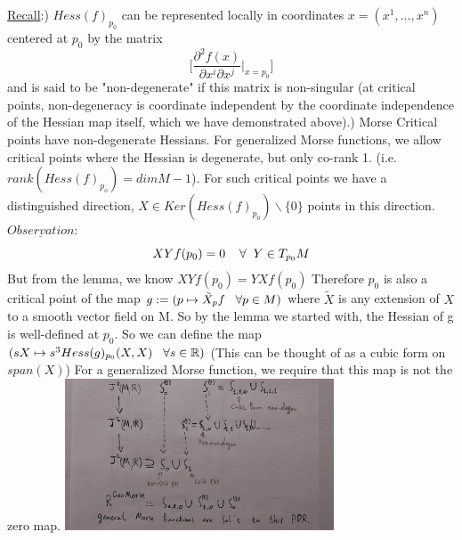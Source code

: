 \documentclass{article}
\newtheorem{proposed work}[theorem]{Proposed Work}
\begin{document}
\underline{Recall}:) $Hess(f)_{p_0}$ can be represented locally in coordinates $x=(x^1,...,x^n)$ centered at $p_0$ by the matrix $$\Big[\frac{\partial^2 f(x)}{\partial x^i \partial x^j}\Big|_{x=p_0}\Big]$$ and is said to be "non-degenerate" if this matrix is non-singular (at critical points, non-degeneracy is coordinate independent by the coordinate independence of the Hessian map itself, which we have demonstrated above).) Morse Critical points have non-degenerate Hessians.
\newline
\newline
For generalized Morse functions, we allow critical points where the Hessian is degenerate, but only co-rank 1. (i.e. $rank(Hess(f)_{p_o})=dimM-1$). For such critical points we have a distinguished direction, $X\in Ker(Hess(f)_{p_0})\backslash \{0\}$ points in this direction.
\newline
\newline
$\underline{Observation}:$ 
$$XYf(p_0)=0\hspace{4mm} \forall \hspace{2mm}Y\in T_{p_0}M$$
But from the lemma, we know $XYf(p_0)=YXf(p_0)$
Therefore $p_0$ is also a critical point of the map $g:=(p\mapsto \tilde{X}_pf \hspace{3mm}\forall p\in M)$ where $\tilde{X}$ is any extension of $X$ to a smooth vector field on M. So by the lemma we started with, the Hessian of g is well-defined at $p_0.$
So we can define the map \newline
$(sX\mapsto s^3Hess(g)_{p_0}(X,X)\hspace{3mm} \forall s\in \mathbb{R})$ \hspace{4mm}(This can be thought of as a cubic form on $span(X)$)
For a generalized Morse function, we require that this map is not the zero map.
\newline
\includegraphics[width=8cm]{GeneralMorse.jpg}
\end{document}
